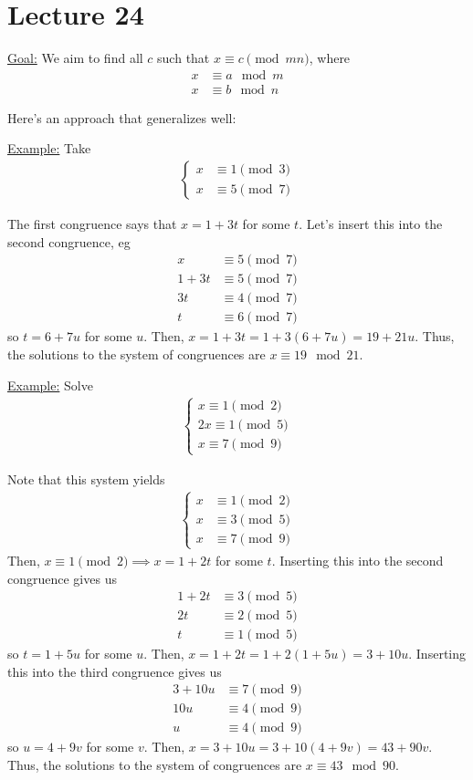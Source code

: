 \documentclass{article}
\begin{document}
\section{Lecture 24}

\underline{Goal:} We aim to find all $c$ such that $x\equiv c\pmod {mn}$, where \begin{align*}
    x&\equiv a\mod m\\
    x&\equiv b\mod n
\end{align*}

Here's an approach that generalizes well:

\underline{Example:} Take \begin{align*}
    \begin{cases}
        x&\equiv 1\pmod 3\\
        x&\equiv 5\pmod 7
    \end{cases}
\end{align*}

The first congruence says that $x=1+3t$ for some $t$. Let's insert this into the second congruence, eg \begin{align*}
    x&\equiv 5\pmod 7\\
    1+3t&\equiv 5\pmod 7\\
    3t&\equiv 4\pmod 7\\
    t&\equiv 6\pmod 7
\end{align*}so $t=6+7u$ for some $u$. Then, $x=1+3t=1+3(6+7u)=19+21u$. Thus, the solutions to the system of congruences are $x\equiv 19\mod 21$.

\underline{Example:} Solve \begin{align*}
    \begin{cases}
        x\equiv 1\pmod 2\\
        2x\equiv 1\pmod 5\\
        x\equiv 7\pmod 9
    \end{cases}
\end{align*}

Note that this system yields \begin{align*}
    \begin{cases}
        x&\equiv 1\pmod 2\\
        x&\equiv 3\pmod 5\\
        x&\equiv 7\pmod 9
    \end{cases}
\end{align*}Then, $x\equiv 1\pmod 2\implies x=1+2t$ for some $t$. Inserting this into the second congruence gives us \begin{align*}
    1+2t&\equiv 3\pmod 5\\
    2t&\equiv 2\pmod 5\\
    t&\equiv 1\pmod 5
\end{align*}so $t=1+5u$ for some $u$. Then, $x=1+2t=1+2(1+5u)=3+10u$. Inserting this into the third congruence gives us \begin{align*}
    3+10u&\equiv 7\pmod 9\\
    10u&\equiv 4\pmod 9\\
    u&\equiv 4\pmod 9
\end{align*}so $u=4+9v$ for some $v$. Then, $x=3+10u=3+10(4+9v)=43+90v$. Thus, the solutions to the system of congruences are $x\equiv 43\mod 90$.
\end{document}
